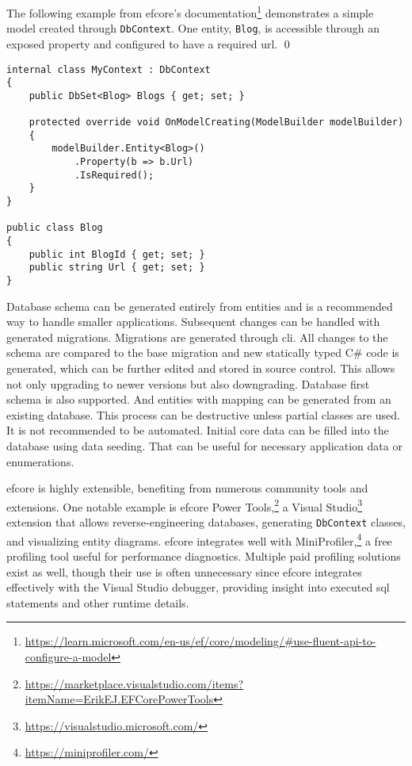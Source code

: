\begin{example}
\small
The following example from \acrshort{efcore}'s documentation\footnote{\url{https://learn.microsoft.com/en-us/ef/core/modeling/\#use-fluent-api-to-configure-a-model}} demonstrates a simple model created through \texttt{DbContext}. One entity, \texttt{Blog}, is accessible through an exposed property and configured to have a required \acrshort{url}.
\qed

\begin{lstlisting}[language=CSharp]
internal class MyContext : DbContext
{
    public DbSet<Blog> Blogs { get; set; }

    protected override void OnModelCreating(ModelBuilder modelBuilder)
    {
        modelBuilder.Entity<Blog>()
            .Property(b => b.Url)
            .IsRequired();
    }
}

public class Blog
{
    public int BlogId { get; set; }
    public string Url { get; set; }
}
\end{lstlisting}
\end{example}

Database schema can be generated entirely from entities and is a recommended way to handle smaller applications. Subsequent changes can be handled with generated migrations. Migrations are generated through \acrshort{cli}. All changes to the schema are compared to the base migration and new statically typed C\# code is generated, which can be further edited and stored in source control. This allows not only upgrading to newer versions but also downgrading. Database first schema is also supported. And entities with mapping can be generated from an existing database. This process can be destructive unless partial classes are used. It is not recommended to be automated. Initial core data can be filled into the database using data seeding. That can be useful for necessary application data or enumerations.

\acrshort{efcore} is highly extensible, benefiting from numerous community tools and extensions. One notable example is \acrshort{efcore} Power Tools,\footnote{\url{https://marketplace.visualstudio.com/items?itemName=ErikEJ.EFCorePowerTools}} a Visual Studio\footnote{\url{https://visualstudio.microsoft.com/}} extension that allows reverse-engineering databases, generating \texttt{DbContext} classes, and visualizing entity diagrams. \acrshort{efcore} integrates well with MiniProfiler,\footnote{\url{https://miniprofiler.com/}} a free profiling tool useful for performance diagnostics. Multiple paid profiling solutions exist as well, though their use is often unnecessary since \acrshort{efcore} integrates effectively with the Visual Studio debugger, providing insight into executed \acrshort{sql} statements and other runtime details.


